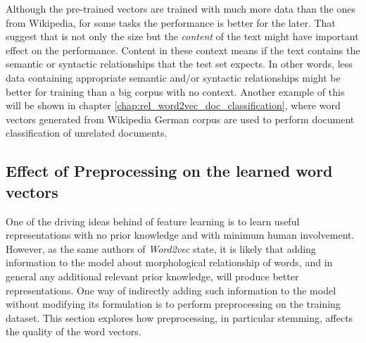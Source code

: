 Although the pre-trained vectors are trained with much more data
than the ones from Wikipedia, for some tasks the performance is better for the
later. That suggest that is not only the size but the \emph{content} of the
text might have important effect on the performance. Content  in these context
means if the text contains the semantic or syntactic relationships  that the
test set expects. In other words, less data containing appropriate  semantic and/or
syntactic relationships might be better for training than a big corpus with
no context. Another example of this will be shown in chapter
\ref{chap:rel_word2vec_doc_classification}, where  word vectors generated
from Wikipedia German corpus are used to perform document classification of
unrelated documents.





\subsection{Effect of Preprocessing on the learned word vectors}
\label{sec:sub:effects_of_preprocessing_on_learned_word_vectors}

One of the driving ideas behind of feature learning is to learn useful
representations with no prior knowledge and with minimum human
involvement. However, as the same authors of \textit{Word2vec} state, it is likely
that adding information to the model about morphological relationship of
words, and in general any additional relevant prior knowledge,  will produce better
representations.  One way of indirectly adding such information to the model
without modifying its formulation is to perform preprocessing on the training
dataset. This section explores how preprocessing, in particular stemming,  affects the
quality of the word vectors. 
 


